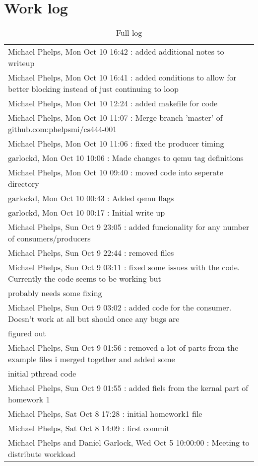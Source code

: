 \documentclass[letterpaper,10pt,titlepage]{article}
\begin{document}
\section{Work log}

\begin{table}[H]
  \small
\caption{Full log}

\begin{tabular}{l}
\hline
Michael Phelps, Mon Oct 10 16:42 : added additional notes to writeup\\
Michael Phelps, Mon Oct 10 16:41 : added conditions to allow for better blocking instead of just continuing to loop\\
Michael Phelps, Mon Oct 10 12:24 : added makefile for code\\
Michael Phelps, Mon Oct 10 11:07 : Merge branch 'master' of github.com:phelpsmi/cs444-001\\
Michael Phelps, Mon Oct 10 11:06 : fixed the producer timing\\
garlockd, Mon Oct 10 10:06 : Made changes to qemu tag definitions\\
Michael Phelps, Mon Oct 10 09:40 : moved code into seperate directory\\
garlockd, Mon Oct 10 00:43 : Added qemu flags\\
garlockd, Mon Oct 10 00:17 : Initial write up\\
Michael Phelps, Sun Oct 9 23:05 : added funcionality for any number of consumers/producers\\
Michael Phelps, Sun Oct 9 22:44 : removed files\\
Michael Phelps, Sun Oct 9 03:11 : fixed some issues with the code. Currently the code seems to be working but\\ probably needs some fixing\\
Michael Phelps, Sun Oct 9 03:02 : added code for the consumer. Doesn't work at all but should once any bugs are\\ figured out\\
Michael Phelps, Sun Oct 9 01:56 : removed a lot of parts from the example files i merged together and added some\\ initial pthread code\\
Michael Phelps, Sun Oct 9 01:55 : added fiels from the kernal part of homework 1\\
Michael Phelps, Sat Oct 8 17:28 : initial homework1 file\\
Michael Phelps, Sat Oct 8 14:09 : first commit\\
Michael Phelps and Daniel Garlock, Wed Oct 5 10:00:00 : Meeting to distribute workload\\
\hline
\end{tabular}
\end{table}
\end{document}
